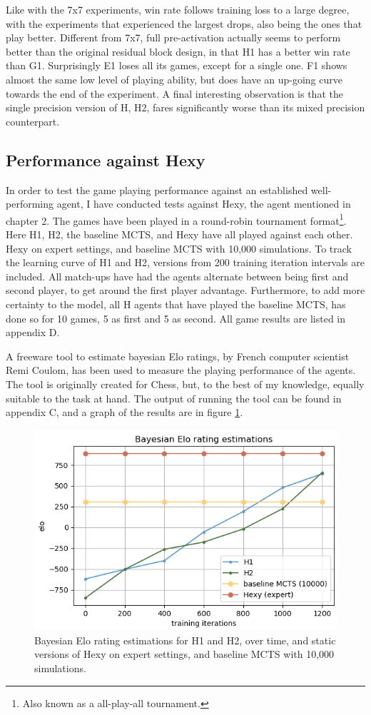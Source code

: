 Like with the 7x7 experiments, win rate follows training loss to a large degree, with the experiments that experienced the largest drops, also being the ones that play better. Different from 7x7, full pre-activation actually seems to perform better than the original residual block design, in that H1 has a better win rate than G1. Surprisingly E1 loses all its games, except for a single one. F1 shows almost the same low level of playing ability, but does have an up-going curve towards the end of the experiment. A final interesting observation is that the single precision version of H, H2, fares significantly worse than its mixed precision counterpart.

\subsection{Performance against Hexy}
In order to test the game playing performance against an established well-performing agent, I have conducted tests against Hexy, the agent mentioned in chapter 2. The games have been played in a round-robin tournament format\footnote{Also known as a all-play-all tournament.}. Here H1, H2, the baseline MCTS, and Hexy have all played against each other. Hexy on expert settings, and baseline MCTS with 10,000 simulations. To track the learning curve of H1 and H2, versions from 200 training iteration intervals are included. All match-ups have had the agents alternate between being first and second player, to get around the first player advantage. Furthermore, to add more certainty to the model, all H agents that have played the baseline MCTS, has done so for 10 games, 5 as first and 5 as second. All game results are listed in appendix D.

A freeware tool to estimate bayesian Elo ratings, by French computer scientist Remi Coulom, has been used to measure the playing performance of the agents\cite{Coulom}. The tool is originally created for Chess, but, to the best of my knowledge, equally suitable to the task at hand. The output of running the tool can be found in appendix C, and a graph of the results are in figure \ref{fig-elo}.

\begin{figure}[ht]
	\centering
	\includegraphics[width=.75\textwidth]{figures/elo}
	\caption{Bayesian Elo rating estimations for H1 and H2, over time, and static versions of Hexy on expert settings, and baseline MCTS with 10,000 simulations.}
	\label{fig-elo}
\end{figure}

